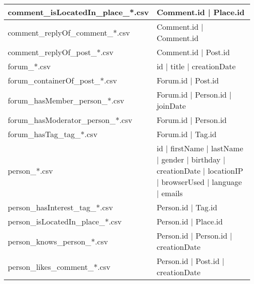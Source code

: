 \begin{table}[htb]
\begin{tabular}{|p{4.6cm}|p{11.4cm}|}
        comment\_isLocatedIn\_place\_*.csv       & Comment.id | Place.id                                                                                       \\ \hline
        comment\_replyOf\_comment\_*.csv         & Comment.id | Comment.id                                                                                     \\ \hline
        comment\_replyOf\_post\_*.csv            & Comment.id | Post.id                                                                                        \\ \hline
        forum\_*.csv                             & id | title | creationDate                                                                                   \\ \hline
        forum\_containerOf\_post\_*.csv          & Forum.id | Post.id                                                                                          \\ \hline
        forum\_hasMember\_person\_*.csv          & Forum.id | Person.id | joinDate                                                                             \\ \hline
        forum\_hasModerator\_person\_*.csv       & Forum.id | Person.id                                                                                        \\ \hline
        forum\_hasTag\_tag\_*.csv                & Forum.id | Tag.id                                                                                           \\ \hline
        person\_*.csv                            & id | firstName | lastName | gender | birthday | creationDate | locationIP | browserUsed | language | emails \\ \hline
        person\_hasInterest\_tag\_*.csv          & Person.id | Tag.id                                                                                          \\ \hline
        person\_isLocatedIn\_place\_*.csv        & Person.id | Place.id                                                                                        \\ \hline
        person\_knows\_person\_*.csv             & Person.id | Person.id | creationDate                                                                        \\ \hline
        person\_likes\_comment\_*.csv            & Person.id | Post.id | creationDate                                                                          \\ \hline

\end{tabular}
\end{table}
